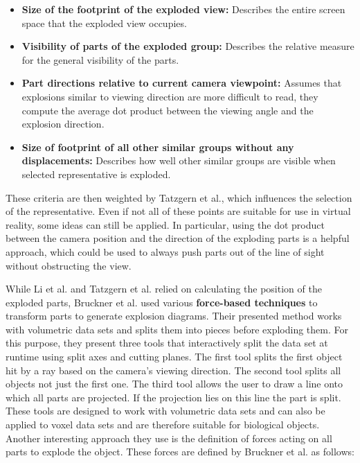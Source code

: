 \begin{itemize}
	\item \textbf{Size of the footprint of the exploded view:} Describes the entire screen space that the exploded view occupies.
	\item \textbf{Visibility of parts of the exploded group:} Describes the relative measure for the general visibility of the parts.
	\item \textbf{Part directions relative to current camera viewpoint:} Assumes that explosions similar to viewing direction are more difficult to read, they compute the average dot product between the viewing angle and the explosion direction.
	\item \textbf{Size of footprint of all other similar groups without any displacements:} Describes how well other similar groups are visible when selected representative is exploded.
\end{itemize}

These criteria are then weighted by Tatzgern et al., which influences the selection of the representative.\cite{Tatzgern_2010}
Even if not all of these points are suitable for use in virtual reality, some ideas can still be applied.
In particular, using the dot product between the camera position and the direction of the exploding parts is a helpful approach, which could be used to always push parts out of the line of sight without obstructing the view.

While Li et al. and Tatzgern et al. relied on calculating the position of the exploded parts, Bruckner et al. used various \textbf{force-based techniques} to transform parts to generate explosion diagrams.
Their presented method works with volumetric data sets and splits them into pieces before exploding them. 
For this purpose, they present three tools that interactively split the data set at runtime using split axes and cutting planes. 
The first tool splits the first object hit by a ray based on the camera's viewing direction. The second tool splits all objects not just the first one. The third tool allows the user to draw a line onto which all parts are projected. If the projection lies on this line the part is split. 
These tools are designed to work with volumetric data sets and can also be applied to voxel data sets and are therefore suitable for biological objects.
Another interesting approach they use is the definition of forces acting on all parts to explode the object.
These forces are defined by Bruckner et al. as follows:

